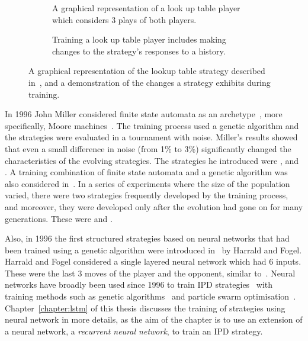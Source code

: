 \begin{figure}[!hbtp]
    \begin{subfigure}{.45\textwidth}\centering
        
        \caption{A graphical representation of a look up table player which considers
        3 plays of both players.}\label{fig:lookup_table_diagram}
    \end{subfigure}\hspace{.5cm}
    \begin{subfigure}{.45\textwidth}\centering
        
        \caption{Training a look up table player includes making changes to the
        strategy's responses to a history.}\label{fig:lookup_table_diagram_choice}
     \end{subfigure}
     \caption{A graphical representation of the lookup table strategy described
     in~\cite{Axelrod1987}, and a demonstration of the changes a strategy exhibits
     during training.}\label{fig:lookup_table}
\end{figure}

In 1996 John Miller considered finite state automata as an
archetype~\cite{Miller1996}, more specifically, Moore
machines~\cite{moore1956}. The training process used a genetic algorithm and
the strategies were evaluated in a tournament with noise.
Miller's results showed that even a small
difference in noise (from 1\% to 3\%) significantly changed the characteristics
of the evolving strategies. The strategies he introduced were \PunishTwice,
\PunishOnceForTwoTats and \PunishTwiceandWait.
A training combination of finite state automata and a genetic algorithm was
also considered in~\cite{Ashlock2006b}. In a series of experiments where the size of
the population varied, there were two strategies frequently developed by the
training process, and moreover, they were developed only after the evolution had
gone on for many generations. These were \FortressThree and
\FortressFour.

Also, in 1996 the first structured strategies based on
neural networks that had been trained using a genetic algorithm were introduced
in~\cite{Harrald1996} by Harrald and Fogel. Harrald and Fogel considered a
single layered neural network which had 6 inputs. These were the last 3 moves of
the player and the opponent, similar to~\cite{Axelrod1987}. Neural networks have
broadly been used since 1996 to train IPD strategies~\cite{Ashlock2008, Ashlock2006a, Darwen2001,
Franken2005} with training methods such as genetic
algorithms~\cite{Ashlock2006a, Chong2005, Marks1999} and particle swarm
optimisation~\cite{Franken2005}. Chapter~\ref{chapter:lstm} of this thesis discusses
the training of strategies using neural network in more details, as the aim of
the chapter is to use an extension of a neural network, a
\textit{recurrent neural network}, to train an IPD strategy.

